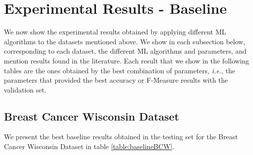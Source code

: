 \section{Experimental Results - Baseline}
\label{ssec:ExperimentalResultsBaseline}


We now show the experimental results obtained by applying different \ac{ML} algorithms to the datasets mentioned above. We show in each subsection below, corresponding to each dataset, the different \ac{ML} algorithms and parameters, and mention results found in the literature. Each result that we show in the following tables are the ones obtained by the best combination of parameters, \textit{i.e.}, the parameters that provided the best accuracy or F-Measure results with the validation set.

\subsection{Breast Cancer Wisconsin Dataset}

We present the best baseline results obtained in the testing set for the Breast Cancer Wisconsin Dataset in table \ref{table:baselineBCW}.

